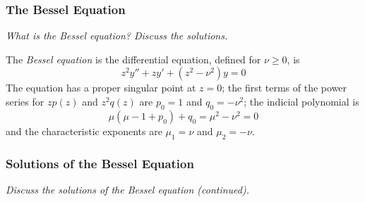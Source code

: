 \documentclass[11pt, a4paper]{article}
\newcommand{\question}[1]{\textit{#1}\vspace{2mm}}
\begin{document}
\subsubsection{The Bessel Equation}
\question{What is the Bessel equation? Discuss the solutions.}

The \textit{Bessel equation} is the differential equation, defined for $ \nu \geq 0 $, is
\begin{equation*}
	z^{2}y'' + zy' + (z^{2} - \nu^{2})y = 0
\end{equation*}
The equation has a proper singular point at $ z = 0 $; the first terms of the power series for $ zp(z) $ and $ z^{2}q(z) $ are $ p_{0} = 1 $ and $ q_{0} = - \nu^{2}$; the indicial polynomial is
\begin{equation*}
	\mu (\mu - 1 + p_{0}) + q_{0} = \mu^{2} - \nu^{2} = 0
\end{equation*}
and the characteristic exponents are $ \mu_{1} = \nu $ and $ \mu_{2} = - \nu $. 

\subsubsection{Solutions of the Bessel Equation}
\question{Discuss the solutions of the Bessel equation (continued).}
\end{document}
